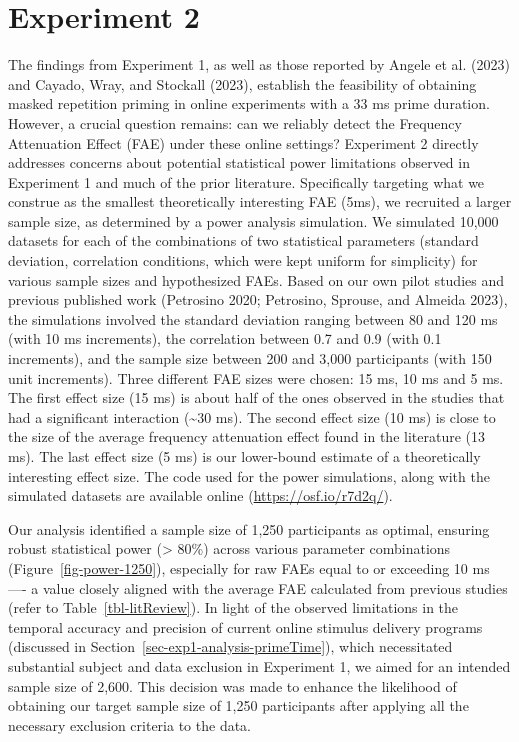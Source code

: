 \documentclass[
]{interact}
\begin{document}
\section{Experiment 2}\label{experiment-2}

The findings from Experiment 1, as well as those reported by Angele et
al. (2023) and Cayado, Wray, and Stockall (2023), establish the
feasibility of obtaining masked repetition priming in online experiments
with a 33 ms prime duration. However, a crucial question remains: can we
reliably detect the Frequency Attenuation Effect (FAE) under these
online settings? Experiment 2 directly addresses concerns about
potential statistical power limitations observed in Experiment 1 and
much of the prior literature. Specifically targeting what we construe as
the smallest theoretically interesting FAE (5ms), we recruited a larger
sample size, as determined by a power analysis simulation. We simulated
10,000 datasets for each of the combinations of two statistical
parameters (standard deviation, correlation conditions, which were kept
uniform for simplicity) for various sample sizes and hypothesized FAEs.
Based on our own pilot studies and previous published work (Petrosino
2020; Petrosino, Sprouse, and Almeida 2023), the simulations involved
the standard deviation ranging between 80 and 120 ms (with 10 ms
increments), the correlation between 0.7 and 0.9 (with 0.1 increments),
and the sample size between 200 and 3,000 participants (with 150 unit
increments). Three different FAE sizes were chosen: 15 ms, 10 ms and 5
ms. The first effect size (15 ms) is about half of the ones observed in
the studies that had a significant interaction (\textasciitilde30 ms).
The second effect size (10 ms) is close to the size of the average
frequency attenuation effect found in the literature (13 ms). The last
effect size (5 ms) is our lower-bound estimate of a theoretically
interesting effect size. The code used for the power simulations, along
with the simulated datasets are available online
(\url{https://osf.io/r7d2q/}).

Our analysis identified a sample size of 1,250 participants as optimal,
ensuring robust statistical power (\textgreater{} 80\%) across various
parameter combinations (Figure~\ref{fig-power-1250}), especially for raw
FAEs equal to or exceeding 10 ms ---- a value closely aligned with the
average FAE calculated from previous studies (refer to
Table~\ref{tbl-litReview}). In light of the observed limitations in the
temporal accuracy and precision of current online stimulus delivery
programs (discussed in Section~\ref{sec-exp1-analysis-primeTime}), which
necessitated substantial subject and data exclusion in Experiment 1, we
aimed for an intended sample size of 2,600. This decision was made to
enhance the likelihood of obtaining our target sample size of 1,250
participants after applying all the necessary exclusion criteria to the
data.
\end{document}
